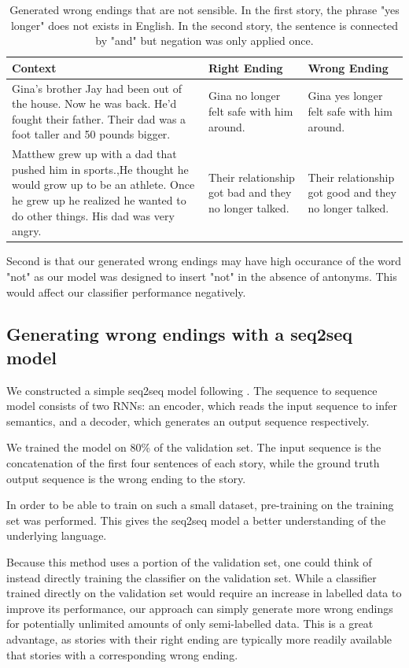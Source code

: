 \documentclass{article}
\begin{document}
\begin{table}[h]\footnotesize
  \centering
  \begin{tabular}{ p{6cm} p{3cm} p{3cm} }
    \toprule
    Context & Right Ending & Wrong Ending \\
    \midrule
    Gina's brother Jay had been out of the house. Now he was back. He'd fought their father. Their dad was a foot taller and 50 pounds bigger. & Gina no longer felt safe with him around. & Gina yes longer felt safe with him around.\\
    \hline
    Matthew grew up with a dad that pushed him in sports.,He thought he would grow up to be an athlete. Once he grew up he realized he wanted to do other things. His dad was very angry. & Their relationship got bad and they no longer talked. & Their relationship got good and they no longer talked. \\
  \bottomrule

  \end{tabular}
  \label{Tab:strange}
  \caption{Generated wrong endings that are not sensible. In the first story, the phrase "yes longer" does not exists in English. In the second story, the sentence is connected by "and" but negation was only applied once.}
\end{table}

Second is that our generated wrong endings may have high occurance of the word "not" as our model was designed to insert "not" in the absence of antonyms. This would affect our classifier performance negatively.

\subsection{Generating wrong endings with a seq2seq model}
We constructed a simple seq2seq model following \cite{tfseq2seq}. The sequence to sequence model consists of two RNNs: an encoder, which reads the input sequence to infer semantics, and a decoder, which generates an output sequence respectively.

We trained the model on 80\% of the validation set. The input sequence is the concatenation of the first four sentences of each story, while the ground truth output sequence is the wrong ending to the story.

In order to be able to train on such a small dataset, pre-training on the training set was performed. This gives the seq2seq model a better understanding of the underlying language.

Because this method uses a portion of the validation set, one could think of instead directly training the classifier on the validation set. 
While a classifier trained directly on the validation set would require an increase in labelled data to improve its performance, our approach can simply generate more wrong endings for potentially unlimited amounts of only semi-labelled data. This is a great advantage, as stories with their right ending are typically more readily available that stories with a corresponding wrong ending.
\end{document}

